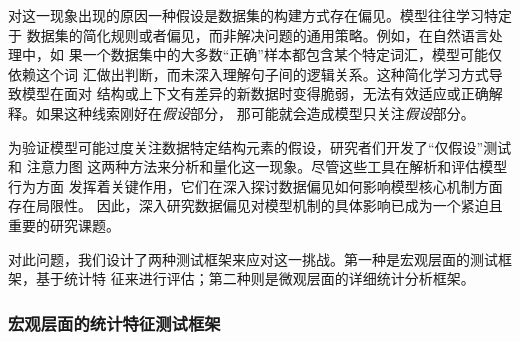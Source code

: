 对这一现象出现的原因一种假设是数据集的构建方式存在偏见。模型往往学习特定于
数据集的简化规则或者偏见，而非解决问题的通用策略。例如，在自然语言处理中，如
果一个数据集中的大多数``正确''样本都包含某个特定词汇，模型可能仅依赖这个词
汇做出判断，而未深入理解句子间的逻辑关系。这种简化学习方式导致模型在面对
结构或上下文有差异的新数据时变得脆弱，无法有效适应或正确解释。如果这种线索刚好在\textit{假设}部分，
那可能就会造成模型只关注\textit{假设}部分。

为验证模型可能过度关注数据特定结构元素的假设，研究者们开发了``仅假设''测试\cite{gururangan2018annotation}和
注意力图\cite{vig2019multiscale}
这两种方法来分析和量化这一现象。尽管这些工具在解析和评估模型行为方面
发挥着关键作用，它们在深入探讨数据偏见如何影响模型核心机制方面存在局限性。
因此，深入研究数据偏见对模型机制的具体影响已成为一个紧迫且重要的研究课题。

对此问题，我们设计了两种测试框架来应对这一挑战。第一种是宏观层面的测试框架，基于统计特
征来进行评估；第二种则是微观层面的详细统计分析框架。




\subsubsection*{宏观层面的统计特征测试框架}

